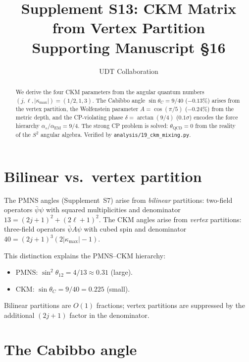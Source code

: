 \documentclass[11pt,letterpaper]{article}
\title{Supplement S13: CKM Matrix from Vertex Partition \\
\large Supporting Manuscript \S16}
\author{UDT Collaboration}
\date{}
\numberwithin{equation}{section}
\begin{document}
\maketitle

\begin{abstract}
We derive the four CKM parameters from the angular quantum numbers
$(j, \ell, |\kappa_\mathrm{max}|) = (1/2, 1, 3)$.  The Cabibbo angle
$\sin\theta_C = 9/40$ ($-0.13\%$) arises from the vertex partition,
the Wolfenstein parameter $A = \cos(\pi/5)$ ($-0.24\%$) from the
metric depth, and the CP-violating phase
$\delta = \arctan(9/4)$ ($0.1\sigma$) encodes the force hierarchy
$\alpha_s/\alpha_\mathrm{EM} = 9/4$.  The strong CP problem is
solved: $\theta_\mathrm{QCD} = 0$ from the reality of the $S^2$
angular algebra.  Verified by \texttt{analysis/19\_ckm\_mixing.py}.
\end{abstract}

\tableofcontents

\section{Bilinear vs.\ vertex partition}
\label{sec:partition}

The PMNS angles (Supplement~S7) arise from \emph{bilinear} partitions:
two-field operators $\bar{\psi}\psi$ with squared multiplicities and
denominator $13 = (2j+1)^2 + (2\ell+1)^2$.  The CKM angles arise from
\emph{vertex} partitions: three-field operators $\bar{\psi}A\psi$ with
cubed spin and denominator $40 = (2j+1)^3(2|\kappa_\mathrm{max}|-1)$.

This distinction explains the PMNS--CKM hierarchy:
\begin{itemize}
  \item PMNS: $\sin^2\theta_{12} = 4/13 \approx 0.31$ (large).
  \item CKM: $\sin\theta_C = 9/40 = 0.225$ (small).
\end{itemize}
Bilinear partitions are $O(1)$ fractions; vertex partitions are
suppressed by the additional $(2j+1)$ factor in the denominator.

\section{The Cabibbo angle}
\label{sec:cabibbo}
\end{document}
